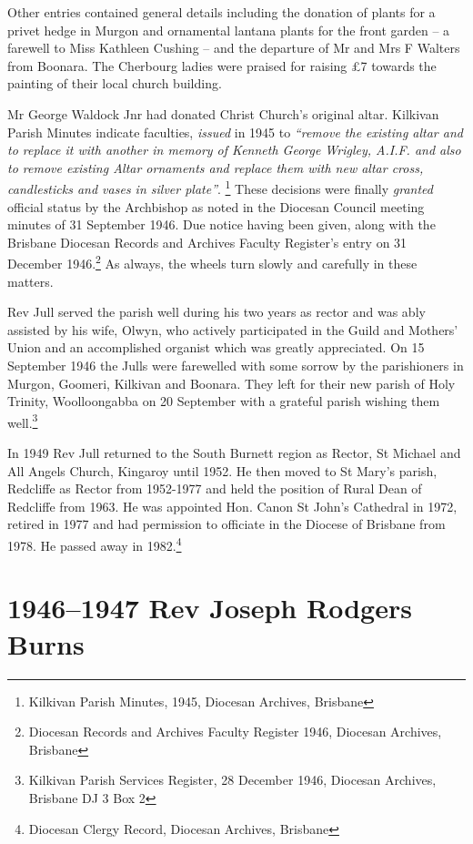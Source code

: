 Other entries contained general details including the donation of plants for a privet hedge in Murgon and ornamental lantana plants for the front garden -- a farewell to Miss Kathleen Cushing -- and the departure of Mr and Mrs F Walters from Boonara. The Cherbourg ladies were praised for raising £7 towards the painting of their local church building.

Mr George Waldock Jnr had donated Christ Church's original altar. Kilkivan Parish Minutes indicate faculties, \emph{issued} in 1945 to \emph{``remove the existing altar and to replace it with another in memory of Kenneth George Wrigley, A.I.F. and also to remove existing Altar ornaments and replace them with new altar cross, candlesticks and vases in silver plate''}. \footnote{Kilkivan Parish Minutes, 1945, Diocesan Archives, Brisbane} These decisions were finally \emph{granted} official status by the Archbishop as noted in the Diocesan Council meeting minutes of 31 September 1946. Due notice having been given, along with the Brisbane Diocesan Records and Archives Faculty Register's entry on 31 December 1946.\footnote{Diocesan Records and Archives Faculty Register 1946, Diocesan Archives, Brisbane} As always, the wheels turn slowly and carefully in these matters.

Rev Jull served the parish well during his two years as rector and was ably assisted by his wife, Olwyn, who actively participated in the Guild and Mothers' Union and an accomplished organist which was greatly appreciated. On 15 September 1946 the Julls were farewelled with some sorrow by the parishioners in Murgon, Goomeri, Kilkivan and Boonara. They left for their new parish of Holy Trinity, Woolloongabba on 20 September with a grateful parish wishing them well.\footnote{Kilkivan Parish Services Register, 28 December 1946, Diocesan Archives, Brisbane DJ 3 Box 2}

In 1949 Rev Jull returned to the South Burnett region as Rector, St Michael and All Angels Church, Kingaroy until 1952. He then moved to St Mary's parish, Redcliffe as Rector from 1952-1977 and held the position of Rural Dean of Redcliffe from 1963. He was appointed Hon. Canon St John's Cathedral in 1972, retired in 1977 and had permission to officiate in the Diocese of Brisbane from 1978. He passed away in 1982.\footnote{Diocesan Clergy Record, Diocesan Archives, Brisbane}

\hypertarget{rev-joseph-rodgers-burns}{%
\section{1946--1947 Rev Joseph Rodgers Burns}\label{rev-joseph-rodgers-burns}}

